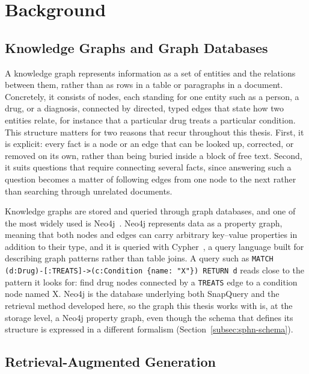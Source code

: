 \chapter{Background} \label{chapter:background}

\section{Knowledge Graphs and Graph Databases} \label{sec:kg-neo4j}

A knowledge graph represents information as a set of entities and the relations
between them, rather than as rows in a table or paragraphs in a document.
Concretely, it consists of nodes, each standing for one entity such as a person,
a drug, or a diagnosis, connected by directed, typed edges that state how two
entities relate, for instance that a particular drug treats a particular
condition. This structure matters for two reasons that recur throughout this
thesis. First, it is explicit: every fact is a node or an edge that can be looked
up, corrected, or removed on its own, rather than being buried inside a block of
free text. Second, it suits questions that require connecting several facts,
since answering such a question becomes a matter of following edges from one node
to the next rather than searching through unrelated documents.

Knowledge graphs are stored and queried through graph databases, and one of the
most widely used is Neo4j~\cite{neo4j2026}. Neo4j represents data as a property
graph, meaning that both nodes and edges can carry arbitrary key--value
properties in addition to their type, and it is queried with
Cypher~\cite{francis2018cypher}, a query language built for describing graph
patterns rather than table joins. A query such as
\texttt{MATCH (d:Drug)-[:TREATS]->(c:Condition \{name: "X"\}) RETURN d} reads
close to the pattern it looks for: find drug nodes connected by a \texttt{TREATS}
edge to a condition node named X. Neo4j is the database underlying both SnapQuery
and the retrieval method developed here, so the graph this thesis works with is,
at the storage level, a Neo4j property graph, even though the schema that defines
its structure is expressed in a different formalism
(Section~\ref{subsec:sphn-schema}).

\section{Retrieval-Augmented Generation} \label{sec:rag-background}

